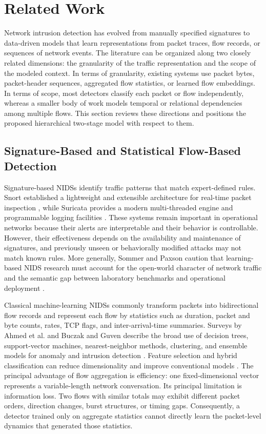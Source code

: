 \section{Related Work}
\label{sec:related_work}

Network intrusion detection has evolved from manually specified signatures to
data-driven models that learn representations from packet traces, flow records,
or sequences of network events. The literature can be organized along two
closely related dimensions: the granularity of the traffic representation and
the scope of the modeled context. In terms of granularity, existing systems use
packet bytes, packet-header sequences, aggregated flow statistics, or learned
flow embeddings. In terms of scope, most detectors classify each packet or flow
independently, whereas a smaller body of work models temporal or relational
dependencies among multiple flows. This section reviews these directions and
positions the proposed hierarchical two-stage model with respect to them.

\subsection{Signature-Based and Statistical Flow-Based Detection}
\label{subsec:rw_signature_flow}

Signature-based NIDSs identify traffic patterns that match expert-defined
rules. Snort established a lightweight and extensible architecture for
real-time packet inspection \cite{Roesch1999}, while Suricata provides a modern
multi-threaded engine and programmable logging facilities
\cite{SuricataGuide2026}. These systems remain important in operational
networks because their alerts are interpretable and their behavior is
controllable. However, their effectiveness depends on the availability and
maintenance of signatures, and previously unseen or behaviorally modified
attacks may not match known rules. More generally, Sommer and Paxson caution
that learning-based NIDS research must account for the open-world character of
network traffic and the semantic gap between laboratory benchmarks and
operational deployment \cite{SommerPaxson2010}.

Classical machine-learning NIDSs commonly transform packets into bidirectional
flow records and represent each flow by statistics such as duration, packet and
byte counts, rates, TCP flags, and inter-arrival-time summaries. Surveys by
Ahmed et al. and Buczak and Guven describe the broad use of decision trees,
support-vector machines, nearest-neighbor methods, clustering, and ensemble
models for anomaly and intrusion detection
\cite{Ahmed2016Survey,BuczakGuven2016}. Feature selection and hybrid
classification can reduce dimensionality and improve conventional models
\cite{Aljawarneh2018}. The principal advantage of flow aggregation is
efficiency: one fixed-dimensional vector represents a variable-length network
conversation. Its principal limitation is information loss. Two flows with
similar totals may exhibit different packet orders, direction changes, burst
structures, or timing gaps. Consequently, a detector trained only on aggregate
statistics cannot directly learn the packet-level dynamics that generated
those statistics.

